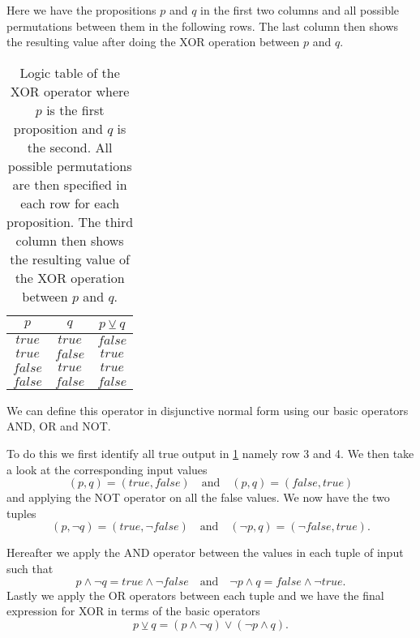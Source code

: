                 Here we have the propositions $p$ and $q$ in the first two columns and all possible permutations between them in the following rows. The last column then shows the resulting value after doing the XOR operation between $p$ and $q$.
                
                \begin{table}[h!]
                    \centering
                    \begin{tabular}{|c|c|c|}
                    	\hline
                    	  $p$   &   $q$   & $p \veebar q$ \\ \hline
                    	$true$  & $true$  &    $false$    \\ \hline
                    	$true$  & $false$ &    $true$     \\ \hline
                    	$false$ & $true$  &    $true$     \\ \hline
                    	$false$ & $false$ &    $false$    \\ \hline
                    \end{tabular}
                    \caption{Logic table of the XOR operator where $p$ is the first proposition and $q$ is the second. All possible permutations are then specified in each row for each proposition. The third column then shows the resulting value of the XOR operation between $p$ and $q$.}
                    \label{LogicTable:XOR}
                \end{table}
            
                We can define this operator in disjunctive normal form using our basic operators AND, OR and NOT. 
                
                To do this we first identify all true output in \ref{LogicTable:XOR} namely row 3 and 4. We then take a look at the corresponding input values
                \begin{equation}
                    (p,q) = (true, false) \quad \text{and} \quad (p,q) = (false, true)
                \end{equation}
                and applying the NOT operator on all the false values. We now have the two tuples
                \begin{equation}
                    (p,\neg q) = (true, \neg false) \quad \text{and} \quad (\neg p, q) = (\neg false, true).
                \end{equation}
                
                Hereafter we apply the AND operator between the values in each tuple of input such that
                \begin{equation}
                    p \wedge \neg q = true \wedge \neg false \quad \text{and} \quad \neg p \wedge q = false \wedge \neg true.
                \end{equation}
                Lastly we apply the OR operators between each tuple and we have the final expression for XOR in terms of the basic operators
                \begin{equation}
                    p \veebar q = (p \wedge \neg q) \vee (\neg p \wedge q).
                \end{equation}
                
